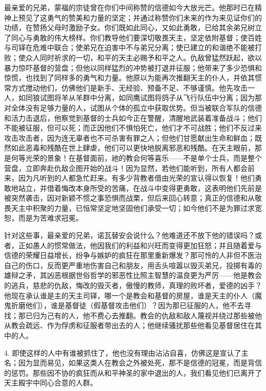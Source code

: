 最亲爱的兄弟，蒙福的宗徒曾在你们中间称赞的信德如今大放光芒。他那时已在精神上预见了这勇气的赞美和力量的坚定；并通过称赞你们未来的作为来见证你们的功绩，在赞扬父母时激励子女。你们既如此同心，又如此勇敢，已给其余弟兄树立了同心与勇敢的伟大榜样。你们教导他们要深切敬畏天主，坚定依附基督；使百姓与司铎在危难中联合；使弟兄在迫害中不与弟兄分离；使已建立的和谐绝不能被打败；使众人同时祈求的一切，和平的天主必赐予和平之人。仇敌曾猛然跃起，欲以暴力惊吓基督的营盘；但他以同样猛烈的冲势被打退并征服；他带来了多少恐惧和惊慌，也找到了同样多的勇气和力量。他原以为能再次推翻天主的仆人，并依其惯常方式搅动他们，仿佛他们是新手、无经验、预备不足、不够谨慎。他先攻击一人，如同狼试图将羊从羊群中分离，如同鹰试图将鸽子从飞行队伍中分离；因为那对全体没有足够力量的人，试图从个体的孤立中获取优势。但当被联合军队的信德和活力击退后，他察觉到基督的士兵如今正在警醒，清醒地武装着准备战斗；他们不能被征服，但可以死；而正因他们不惧怕死亡，他们才不可战胜；他们不反过来攻击攻击者，因为连无辜者也不可杀害有罪之人；但他们甘愿献出生命和鲜血；既然如此恶毒和残酷在世上肆虐，他们可以更快地脱离邪恶和残酷。在天主眼前，那是何等光荣的景象！在基督面前，祂的教会何等喜乐——不是单个士兵，而是整个营盘，立即奔赴仇敌企图开始的战斗！因为显然，若他们能听到，所有人都会前来，因为凡听到的人都急忙赶来。有多少背教者借由光荣的宣认得以恢复！他们勇敢地站立，并借着悔改本身所受的苦痛，在战斗中变得更勇敢，这表明他们先前是被突然袭击，因对新颖不惯之事恐惧而战栗，但后来回心转意；真正的信德和从敬畏天主中积聚的力量，已恒常坚定地坚固他们承受一切；如今他们不是为罪过求宽恕，而是为苦难求冠冕。\par

针对这些事，最亲爱的兄弟，诺瓦替安会说什么？他难道还不放下他的错误吗？或者，正如愚人的惯常做法，他因我们的利益和兴旺而变得更加狂怒；并且随着爱与信德的荣耀日益增长，纷争与嫉妒的疯狂在那里重新爆发？那可怜的人非但不医治自己的伤口，反而更严重地伤害自己和朋友，用舌头喧嚣以毁灭弟兄，投掷有毒的雄辩之矛，其凶恶根据世俗哲学的邪恶性比照主智慧的温良更为严厉——他是教会的逃兵，慈悲的仇敌，悔改的毁灭者，傲慢的教师，真理的败坏者，爱德的凶手？他现在承认谁是主的天主司铎，哪一个是教会和基督的房屋，谁是天主的仆人（魔鬼折磨他们），谁是基督徒（假基督攻击他们）？因为那已征服的人，他不去寻找；那已归为己有的人，他不费心去推翻。教会的仇敌和敌人蔑视并绕过那些被他从教会疏远、作为俘虏和征服者带出去的人；他继续骚扰那些他看见基督居住在其中的人。\par

4. 即使这样的人中有谁被抓住了，他也没有理由沾沾自喜，仿佛这是宣认了主名；因为显而易见，如果这类人在教会之外被处死，那不是信德的冠冕，而是背信的惩罚。那些因不协的疯狂而从和平神圣的家中退出的人，我们看见他们已离开了天主殿宇中同心合意的人群。\par

